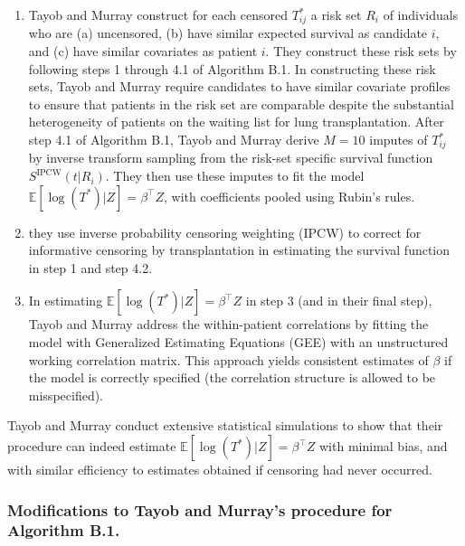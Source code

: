\documentclass[11pt,twoside,]{book}
\begin{document}
\begin{enumerate}
\def\labelenumi{\arabic{enumi}.}
\item
  Tayob and Murray construct for each censored \(T^*_{ij}\) a risk set \(R_i\) of
  individuals who are (a) uncensored, (b) have similar expected survival
  as candidate \(i\), and (c) have similar covariates as patient \(i\). They construct
  these risk sets by following steps 1 through 4.1 of Algorithm B.1. In
  constructing these risk sets, Tayob and Murray require candidates to
  have similar covariate profiles to ensure that patients in the risk set are
  comparable despite the substantial heterogeneity of patients on the waiting
  list for lung transplantation. After step 4.1 of Algorithm B.1, Tayob and Murray derive
  \(M=10\) imputes of \(T^*_{ij}\) by inverse transform sampling from the risk-set
  specific survival function \(S^{\text{IPCW}}(t|R_i)\). They then use these
  imputes to fit the model
  \(\mathbb{E}[\log(T^*) | Z] = \beta^\intercal Z\), with
  coefficients pooled using Rubin's rules.
\item
  they use inverse probability censoring weighting (IPCW) to correct for informative
  censoring by transplantation in estimating the survival function in step 1 and step 4.2.
\item
  In estimating \(\mathbb{E}[\log(T^*)|Z] = \beta^\intercal Z\) in
  step 3 (and in their final step), Tayob and Murray address the
  within-patient correlations by fitting the model with
  Generalized Estimating Equations (GEE) with an unstructured
  working correlation matrix. This approach yields consistent
  estimates of \(\beta\) if the model is correctly specified (the
  correlation structure is allowed to be misspecified).
\end{enumerate}

Tayob and Murray conduct extensive statistical simulations to show that their
procedure can indeed estimate \(\mathbb{E}[\log(T^*) | Z] = \beta^\intercal Z\) with
minimal bias, and with similar efficiency to estimates obtained if censoring had never
occurred.

\newpage

\subsubsection*{Modifications to Tayob and Murray's procedure for Algorithm B.1.}\label{overview-of-the-counterfactual-future-status-imputation-procedure}
\end{document}
